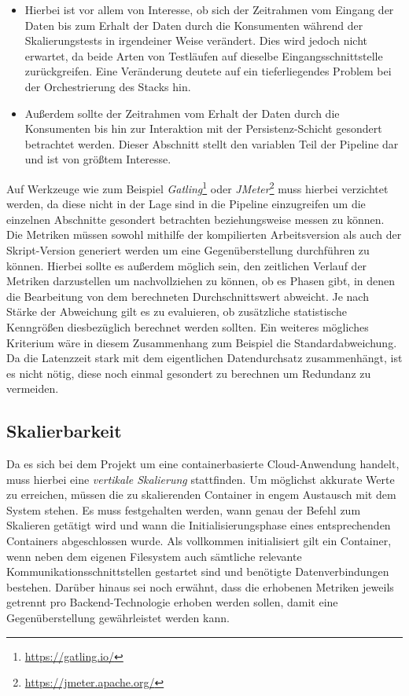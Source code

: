 \begin{itemize}
  \item Hierbei ist vor allem von Interesse, ob sich der Zeitrahmen vom Eingang der Daten bis zum Erhalt der Daten durch die Konsumenten während der Skalierungstests in irgendeiner Weise verändert. Dies wird jedoch nicht erwartet, da beide Arten von Testläufen auf dieselbe Eingangsschnittstelle zurückgreifen. Eine Veränderung deutete auf ein tieferliegendes Problem bei der Orchestrierung des Stacks hin.
  \item Außerdem sollte der Zeitrahmen vom Erhalt der Daten durch die Konsumenten bis hin zur Interaktion mit der Persistenz-Schicht gesondert betrachtet werden. Dieser Abschnitt stellt den variablen Teil der Pipeline dar und ist von größtem Interesse. 
\end{itemize}

Auf Werkzeuge wie zum Beispiel \emph{Gatling}\footnote{\url{https://gatling.io/}} oder \emph{JMeter}\footnote{\url{https://jmeter.apache.org/}} muss hierbei verzichtet werden, da diese nicht in der Lage sind in die Pipeline einzugreifen um die einzelnen Abschnitte gesondert betrachten beziehungsweise messen zu können. Die Metriken müssen sowohl mithilfe der kompilierten Arbeitsversion als auch der Skript-Version generiert werden um eine Gegenüberstellung durchführen zu können. Hierbei sollte es außerdem möglich sein, den zeitlichen Verlauf der Metriken darzustellen um nachvollziehen zu können, ob es Phasen gibt, in denen die Bearbeitung von dem berechneten Durchschnittswert abweicht. Je nach Stärke der Abweichung gilt es zu evaluieren, ob zusätzliche statistische Kenngrößen diesbezüglich berechnet werden sollten. Ein weiteres mögliches Kriterium wäre in diesem Zusammenhang zum Beispiel die Standardabweichung. Da die Latenzzeit stark mit dem eigentlichen Datendurchsatz zusammenhängt, ist es nicht nötig, diese noch einmal gesondert zu berechnen um Redundanz zu vermeiden.


\subsection{Skalierbarkeit}
Da es sich bei dem Projekt um eine containerbasierte Cloud-Anwendung handelt, muss hierbei eine \emph{vertikale Skalierung} stattfinden. Um möglichst akkurate Werte zu erreichen, müssen die zu skalierenden Container in engem Austausch mit dem System stehen. Es muss festgehalten werden, wann genau der Befehl zum Skalieren getätigt wird und wann die Initialisierungsphase eines entsprechenden Containers abgeschlossen wurde. Als vollkommen initialisiert gilt ein Container, wenn neben dem eigenen Filesystem auch sämtliche relevante Kommunikationsschnittstellen gestartet sind und benötigte Datenverbindungen bestehen. Darüber hinaus sei noch erwähnt, dass die erhobenen Metriken jeweils getrennt pro Backend-Technologie erhoben werden sollen, damit eine Gegenüberstellung gewährleistet werden kann.

